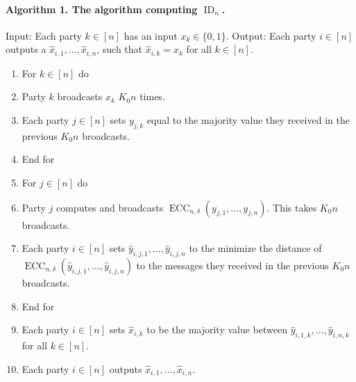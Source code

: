 \paragraph{Algorithm 1. The algorithm computing $\operatorname{ID}_n$.}
Input: Each party $k\in[n]$ has an input $x_k\in\{0,1\}$.
Output: Each party $i\in[n]$ outputs a $\hat x_{i,1},\ldots,\hat x_{i,n}$, such that $\hat x_{i,k}=x_k$ for all $k\in[n]$.
\begin{enumerate}
\item For $k\in[n]$ do
\item \quad Party $k$ broadcasts $x_k$ $K_0 n$ times.
\item \quad Each party $j\in[n]$ sets $y_{j,k}$ equal to the majority value they received in the previous $K_0 n$ broadcasts.
\item End for
\item For $j\in[n]$ do
\item \quad Party $j$ computes and broadcasts $\operatorname{ECC}_{n,\delta}(y_{j,1},\ldots,y_{j,n})$. This takes $K_0 n$ broadcasts.
\item \quad Each party $i\in[n]$ sets $\hat y_{i,j,1},\ldots,\hat y_{i,j,n}$ to the minimize the distance of $\operatorname{ECC}_{n,\delta}(\hat y_{i,j,1},\ldots,\hat y_{i,j,n})$ to the messages they received in the previous $K_0 n$ broadcasts.
\item End for
\item Each party $i\in[n]$ sets $\hat x_{i,k}$ to be the majority value between $\hat y_{i,1,k},\ldots,\hat y_{i,n,k}$ for all $k\in[n]$.
\item Each party $i\in[n]$ outputs $\hat x_{i,1},\ldots,\hat x_{i,n}$.
\end{enumerate}

